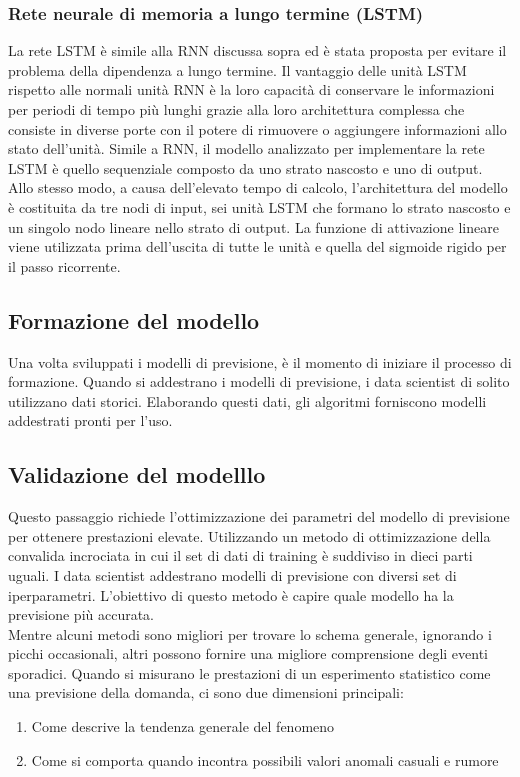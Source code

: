 \documentclass[12pt,a4paper]{report}
\begin{document}
\subsubsection{Rete neurale di memoria a lungo termine (LSTM)}
La rete LSTM è simile alla RNN discussa sopra ed è stata proposta per evitare il problema della dipendenza a lungo termine. Il vantaggio delle unità LSTM rispetto alle normali unità RNN è la loro capacità di conservare le informazioni per periodi di tempo più lunghi grazie alla loro architettura complessa che consiste in diverse porte con il potere di rimuovere o aggiungere informazioni allo stato dell'unità.
Simile a RNN, il modello analizzato per implementare la rete LSTM è quello sequenziale composto da uno strato nascosto e uno di output. Allo stesso modo, a causa dell'elevato tempo di calcolo, l'architettura del modello è costituita da tre nodi di input, sei unità LSTM che formano lo strato nascosto e un singolo nodo lineare nello strato di output. La funzione di attivazione lineare viene utilizzata prima dell'uscita di tutte le unità e quella del sigmoide rigido per il passo ricorrente. 

\subsection{Formazione del modello}
Una volta sviluppati i modelli di previsione, è il momento di iniziare il processo di formazione. Quando si addestrano i modelli di previsione, i data scientist di solito utilizzano dati storici. Elaborando questi dati, gli algoritmi forniscono modelli addestrati pronti per l'uso.


\subsection{Validazione del modelllo}
Questo passaggio richiede l'ottimizzazione dei parametri del modello di previsione per ottenere prestazioni elevate. Utilizzando un metodo di ottimizzazione della convalida incrociata in cui il set di dati di training è suddiviso in dieci parti uguali. I data scientist addestrano modelli di previsione con diversi set di iperparametri. L'obiettivo di questo metodo è capire quale modello ha la previsione più accurata.\\
Mentre alcuni metodi sono migliori per trovare lo schema generale, ignorando i picchi occasionali, altri possono fornire una migliore comprensione degli eventi sporadici. Quando si misurano le prestazioni di un esperimento statistico come una previsione della domanda, ci sono due dimensioni principali:
\begin{enumerate}
    \item Come descrive la tendenza generale del fenomeno
    \item Come si comporta quando incontra possibili valori anomali casuali e rumore
\end{enumerate}
\end{document}
